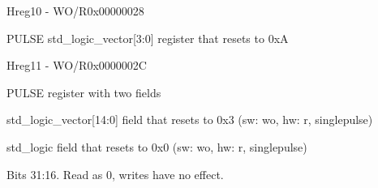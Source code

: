 \documentclass{article}
\begin{document}
\begin{register}{H}{reg10 - WO/R}{0x00000028}  \par PULSE std{\_}logic{\_}vector[3:0] register that resets to 0xA \regnewline
  \label{reg10}
\regnewline
\end{register}

\begin{register}{H}{reg11 - WO/R}{0x0000002C}  \par PULSE register with two fields \regnewline
  \label{reg11}
\regnewline
  \begin{regdesc}\begin{reglist}[field0]
    \item [field0] std{\_}logic{\_}vector[14:0] field that resets to 0x3 (sw: wo, hw: r, singlepulse)
    \item [field1] std{\_}logic field that resets to 0x0 (sw: wo, hw: r, singlepulse)
    \item [reserved] Bits 31:16. Read as 0, writes have no effect.
  \end{reglist}\end{regdesc}
\end{register}
\end{document}
